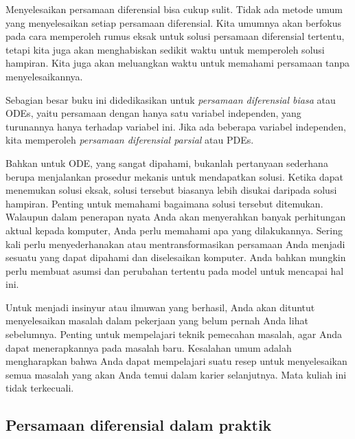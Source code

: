 Menyelesaikan persamaan diferensial bisa cukup sulit.
Tidak ada metode umum yang menyelesaikan setiap persamaan diferensial. Kita
umumnya akan berfokus pada cara memperoleh rumus eksak untuk solusi persamaan
diferensial tertentu, tetapi kita juga akan menghabiskan sedikit waktu
untuk memperoleh solusi hampiran.
Kita juga akan meluangkan waktu untuk memahami persamaan tanpa menyelesaikannya.

Sebagian besar buku ini didedikasikan untuk
\emph{persamaan diferensial biasa}
atau ODEs, yaitu persamaan dengan
hanya satu variabel independen, yang turunannya hanya terhadap
variabel ini.
Jika ada beberapa variabel independen, kita memperoleh
\emph{persamaan diferensial parsial}
atau PDEs.

Bahkan untuk ODE, yang sangat dipahami, bukanlah pertanyaan sederhana
berupa menjalankan prosedur mekanis untuk mendapatkan solusi.
Ketika dapat menemukan solusi eksak, solusi tersebut biasanya lebih disukai
daripada solusi hampiran. Penting untuk memahami bagaimana solusi tersebut ditemukan.
Walaupun dalam penerapan nyata Anda akan menyerahkan banyak perhitungan aktual
kepada komputer, Anda perlu memahami apa yang dilakukannya.
Sering kali perlu menyederhanakan atau mentransformasikan persamaan Anda
menjadi sesuatu yang dapat dipahami dan diselesaikan komputer.
Anda bahkan mungkin perlu membuat asumsi dan perubahan tertentu pada model
untuk mencapai hal ini.

Untuk menjadi insinyur atau ilmuwan yang berhasil, Anda akan dituntut menyelesaikan
masalah dalam pekerjaan yang belum pernah Anda lihat sebelumnya. Penting untuk
mempelajari teknik pemecahan masalah, agar Anda dapat menerapkannya pada masalah baru.
Kesalahan umum adalah mengharapkan bahwa Anda dapat mempelajari suatu resep
untuk menyelesaikan semua masalah yang akan Anda temui dalam karier selanjutnya.
Mata kuliah ini tidak terkecuali.

\subsection{Persamaan diferensial dalam praktik}

